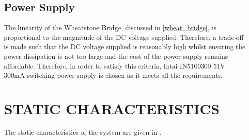 \documentclass[10pt,twocolumn]{witseiepaper}
\begin{document}
\subsection{Power Supply} 

The linearity of the Wheatstone Bridge, discussed in \cref{wheat_bridge}, is proportional to the magnitude of the DC voltage supplied. Therefore, a trade-off is made such that the DC voltage supplied is reasonably high whilst ensuring the power dissipation is not too large and the cost of the power supply remains affordable. Therefore, in order to satisfy this criteria, Intai IN5100300 51V 300mA switching power supply \cite{psu} is chosen as it meets all the requirements.

\section{STATIC CHARACTERISTICS}

The static characteristics of the system are given in .
\end{document}
